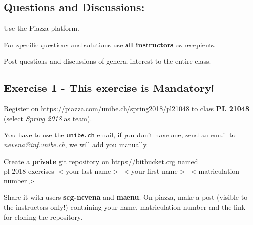 \documentclass [11pt, a4wide, twoside]{article}
\begin{document}
\subsection*{Questions and Discussions:}
\begin{myitemize}
\item Use the Piazza platform.
\item For specific questions and solutions use \textbf{all instructors} as recepients.
\item Post questions and discussions of general interest to the entire class.
\end{myitemize}

\subsection*{Exercise 1 - This exercise is Mandatory!}
\begin{myitemize}
\item Register on \url{https://piazza.com/unibe.ch/spring2018/pl21048} to class \textbf{PL 21048} (select \emph{Spring 2018} as team).
\item You have to use the \texttt{unibe.ch} email, if you don't have one, send an email to \emph{nevena@inf.unibe.ch}, we will add you manually.
\item Create a \textbf{private} git repository on \url{https://bitbucket.org} named \\
pl-2018-exercises-$<$your-last-name$>$-$<$your-first-name$>$-$<$matriculation-number$>$
\item Share it with users \textbf{scg-nevena} and \textbf{maenu}. On piazza, make a post (visible to the instructors only!) containing your name, matriculation number and the link for cloning the repository.

\end{myitemize}
\end{document}
